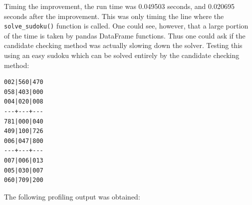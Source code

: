 \documentclass[12pt]{report} %
\begin{document}
Timing the improvement, the run time was 0.049503 seconds, and 0.020695 seconds after the improvement. This was only timing the line where the \texttt{solve\_sudoku()} function is called. One could see, however, that a large portion of the time is taken by pandas DataFrame functions. Thus one could ask if the candidate checking method was actually slowing down the solver. Testing this using an easy sudoku which can be solved entirely by the candidate checking method:

\begin{lstlisting}[caption= {sudoku\_easy.txt}]
002|560|470
058|403|000
004|020|008
---+---+---
781|000|040
409|100|726
006|047|800
---+---+---
007|006|013
005|030|007
060|709|200
\end{lstlisting}

The following profiling output was obtained:
\end{document}
